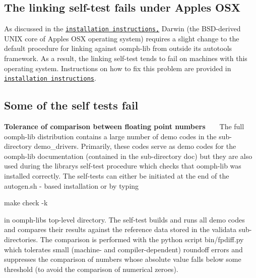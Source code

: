 \hypertarget{index_apple_link}{}\subsection{The linking self-\/test fails under Apple\textquotesingle{}s O\+SX}\label{index_apple_link}
As discussed in the \href{../../the_distribution/html/index.html#apple_linking}{\tt installation instructions,} Darwin (the B\+S\+D-\/derived U\+N\+IX core of Apple\textquotesingle{}s O\+SX operating system) requires a slight change to the default procedure for linking against {\ttfamily oomph-\/lib} from outside its autotools framework. As a result, the linking self-\/test tends to fail on machines with this operating system. Instructions on how to fix this problem are provided in \href{../../the_distribution/html/index.html#apple_linking}{\tt installation instructions}.



\hypertarget{index_self_tests}{}\subsection{Some of the self tests fail}\label{index_self_tests}
{\bfseries Tolerance of comparison between floating point numbers} ~\newline
~\newline
 The full {\ttfamily oomph-\/lib} distribution contains a large number of demo codes in the sub-\/directory {\ttfamily demo\+\_\+drivers}. Primarily, these codes serve as demo codes for the {\ttfamily oomph-\/lib} documentation (contained in the sub-\/directory {\ttfamily doc}) but they are also used during the library\textquotesingle{}s self-\/test procedure which checks that {\ttfamily oomph-\/lib} was installed correctly. The self-\/tests can either be initiated at the end of the {\ttfamily autogen.\+sh} -\/ based installation or by typing 
\begin{DoxyCode}
make check -k
\end{DoxyCode}
 in {\ttfamily oomph-\/lib\textquotesingle{}s} top-\/level directory. The self-\/test builds and runs all demo codes and compares their results against the reference data stored in the {\ttfamily validata} sub-\/directories. The comparison is performed with the python script {\ttfamily  bin/fpdiff.\+py} which tolerates small (machine-\/ and compiler-\/dependent) roundoff errors and suppresses the comparison of numbers whose absolute value falls below some threshold (to avoid the comparison of numerical zeroes).

